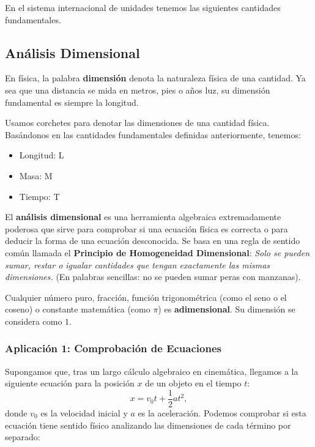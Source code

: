 \documentclass[11pt,a4paper]{book}
\begin{document}
En el sistema internacional de unidades tenemos las siguientes cantidades fundamentales.

\subsection{Análisis Dimensional}

En física, la palabra \textbf{dimensión} denota la naturaleza física de una cantidad. Ya sea que una distancia se mida en metros, pies o años luz, su dimensión fundamental es siempre la longitud. 

Usamos corchetes para denotar las dimensiones de una cantidad física. Basándonos en las cantidades fundamentales definidas anteriormente, tenemos:
\begin{itemize}
    \item Longitud: L
    \item Masa: M
    \item Tiempo: T
\end{itemize}

El \textbf{análisis dimensional} es una herramienta algebraica extremadamente poderosa que sirve para comprobar si una ecuación física es correcta o para deducir la forma de una ecuación desconocida. Se basa en una regla de sentido común llamada el \textbf{Principio de Homogeneidad Dimensional}: \textit{Solo se pueden sumar, restar o igualar cantidades que tengan exactamente las mismas dimensiones.} (En palabras sencillas: no se pueden sumar peras con manzanas).

Cualquier número puro, fracción, función trigonométrica (como el seno o el coseno) o constante matemática (como $\pi$) es \textbf{adimensional}. Su dimensión se considera como $1$.

\subsubsection{Aplicación 1: Comprobación de Ecuaciones}

Supongamos que, tras un largo cálculo algebraico en cinemática, llegamos a la siguiente ecuación para la posición $x$ de un objeto en el tiempo $t$:
\begin{equation}
    x = v_0 t + \frac{1}{2} a t^2,
\end{equation}
donde $v_0$ es la velocidad inicial y $a$ es la aceleración. Podemos comprobar si esta ecuación tiene sentido físico analizando las dimensiones de cada término por separado:
\end{document}
